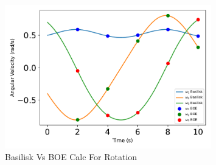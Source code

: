 \begin{figure}[htbp]\centerline{\includegraphics[width=0.8\textwidth]{AutoTeX/scPlusBasiliskVsBOECalcForRotation}}\caption{Basilisk Vs BOE Calc For Rotation}\label{fig:scPlusBasiliskVsBOECalcForRotation}\end{figure}